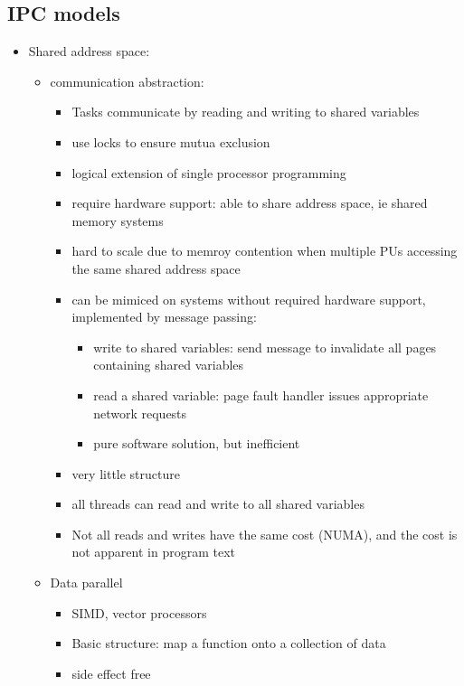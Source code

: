 \documentclass{article}
\begin{document}
\subsection{IPC models}
\begin{itemize}
    \item Shared address space: 
    \begin{itemize}
        \item communication abstraction:
        \begin{itemize}
            \item Tasks communicate by reading and writing to shared variables
            \item use locks to ensure mutua exclusion
            \item logical extension of single processor programming
            \item require hardware support: able to share address space, ie shared memory systems
            \item hard to scale due to memroy contention when multiple PUs accessing the same shared address space
            \item can be mimiced on systems without required hardware support, implemented by message passing: 
            \begin{itemize}
                \item write to shared variables: send message to invalidate all pages containing shared variables
                \item read a shared variable: page fault handler issues appropriate network requests 
                \item pure software solution, but inefficient
            \end{itemize}
            \item very little structure
            \item all threads can read and write to all shared variables
            \item Not all reads and writes have the same cost (NUMA), and the cost is not apparent in program text
        \end{itemize}
        \item Data parallel
        \begin{itemize}
            \item SIMD, vector processors
            \item Basic structure: map a function onto a collection of data
            \item side effect free

\end{itemize}
\end{itemize}
\end{itemize}
\end{document}
